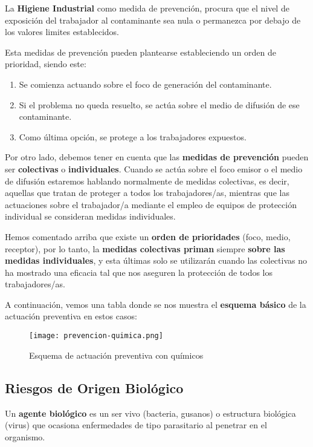La \textbf{Higiene Industrial} como medida de prevención, procura que el nivel de exposición del trabajador al contaminante sea nula o permanezca por debajo de los valores limites establecidos.

Esta medidas de prevención pueden plantearse estableciendo un orden de prioridad, siendo este:

\begin{enumerate}
    \item Se comienza actuando sobre el foco de generación del contaminante.
    \item Si el problema no queda resuelto, se actúa sobre el medio de difusión de ese contaminante.
    \item Como última opción, se protege a los trabajadores expuestos.
\end{enumerate}

Por otro lado, debemos tener en cuenta que las \textbf{medidas de prevención} pueden ser \textbf{colectivas} o \textbf{individuales}. Cuando se actúa sobre el foco emisor o el medio de difusión estaremos hablando normalmente de medidas colectivas, es decir, aquellas que tratan de proteger a todos los trabajadores/as, mientras que las actuaciones sobre el trabajador/a mediante el empleo de equipos de protección individual se consideran medidas individuales.

Hemos comentado arriba que existe un \textbf{orden de prioridades} (foco, medio, receptor), por lo tanto, la \textbf{medidas colectivas priman} siempre \textbf{sobre las medidas individuales}, y esta últimas solo se utilizarán cuando las colectivas no ha mostrado una eficacia tal que nos aseguren la protección de todos los trabajadores/as.

A continuación, vemos una tabla donde se nos muestra el \textbf{esquema básico} de la actuación preventiva en estos casos:

\begin{figure}[H]
    \centering
    \texttt{[image: prevencion-quimica.png]}
    \caption{Esquema de actuación preventiva con químicos}
\end{figure}

\subsection{Riesgos de Origen Biológico}
Un \textbf{agente biológico} es un ser vivo (bacteria, gusanos) o estructura biológica (virus) que ocasiona enfermedades de tipo parasitario al penetrar en el organismo.

